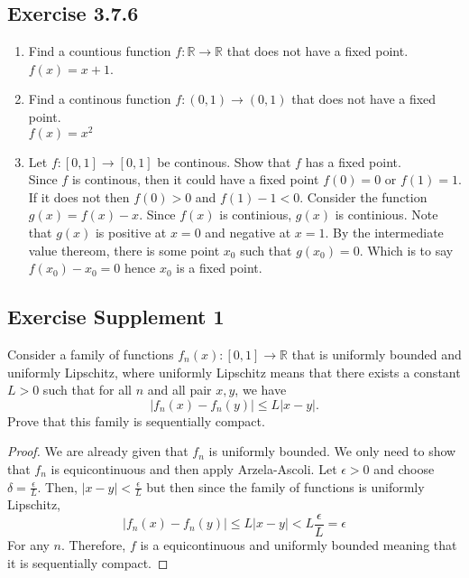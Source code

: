 \documentclass{tufte-book}
\theoremstyle{mytheoremstyle}
\theoremstyle{mylemstyle}
\theoremstyle{mydefstyle}
\begin{document}
\subsection{Exercise 3.7.6}
\begin{enumerate}
\item Find a countious function $f: \mathbb{R} \to \mathbb{R}$ that does not have a fixed point.\\
$f(x) = x+1$.

\item Find a continous function $f:(0,1) \to (0,1)$ that does not have a fixed point.\\
$f(x) = x^2$

\item Let $f:[0,1] \to [0,1]$ be continous.  Show that $f$ has a fixed point.\\

Since $f$ is continous, then it could have a fixed point $f(0) = 0$ or $f(1) = 1$.  If it does not then $f(0) > 0$ and $f(1)-1 < 0$.  Consider the function $g(x) = f(x) - x$.  Since $f(x)$ is continious, $g(x)$ is continious.  Note that $g(x)$ is positive at $x = 0$ and negative at $x  =1$.  By the intermediate value thereom, there is some point $x_0$ such that $g(x_0) = 0$.  Which is to say $f(x_0) - x_0 = 0$ hence $x_0$ is a fixed point.
\end{enumerate}

\subsection{Exercise Supplement 1}
Consider a family of functions $f_n(x): [0,1] \to \mathbb{R}$ that is uniformly bounded and uniformly Lipschitz, where uniformly Lipschitz means that there exists a constant $L>0$ such that for all $n$ and all pair $x,y$, we have
\[|f_n(x) - f_n(y)| \leq L|x-y|. \]
Prove that this family is sequentially compact.  

\begin{proof}

We are already given that $f_n$ is uniformly bounded.  We only need to show that $f_n$ is equicontinuous and then apply Arzela-Ascoli. Let $\epsilon >0$ and choose $\delta = \frac{\epsilon}{L}$.  Then, $|x-y| <\frac{\epsilon}{L}$ but then since the family of functions is uniformly Lipschitz,
\[|f_n(x) - f_n(y)| \leq L|x-y| < L \frac{\epsilon}{L} = \epsilon \]
For any $n$.  Therefore, $f$ is a equicontinuous and uniformly bounded meaning that it is sequentially compact.
\end{proof}
\end{document}
